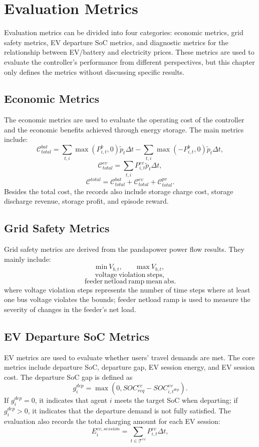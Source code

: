 \section{Evaluation Metrics}

Evaluation metrics can be divided into four categories: economic metrics, grid safety metrics, EV departure SoC metrics, and diagnostic metrics for the relationship between EV/battery and electricity prices. These metrics are used to evaluate the controller's performance from different perspectives, but this chapter only defines the metrics without discussing specific results.

\subsection{Economic Metrics}

The economic metrics are used to evaluate the operating cost of the controller and the economic benefits achieved through energy storage. The main metrics include:
\[
  \mathcal{C}^{bat}_{total}
  =
  \sum_{t,i}
  \max(P^b_{i,t},0)\tilde p_t\Delta t
  -
  \sum_{t,i}
  \max(-P^b_{i,t},0)\tilde p_t\Delta t,
\]
\[
  \mathcal{C}^{ev}_{total}
  =
  \sum_{t,i}
  P^{ev}_{i,t}\tilde p_t\Delta t,
\]
\[
  \mathcal{C}^{total}=\mathcal{C}^{bat}_{total}+\mathcal{C}^{ev}_{total}+\mathcal{C}^{pv}_{total}.
\]
Besides the total cost, the records also include storage charge cost, storage discharge revenue, storage profit, and episode reward.

\subsection{Grid Safety Metrics}

Grid safety metrics are derived from the pandapower power flow results. They mainly include:
\[
  \mathrm{min}\ V_{b,t},\qquad
  \mathrm{max}\ V_{b,t},
\]
\[
  \mathrm{voltage\ violation\ steps},
\]
\[
  \mathrm{feeder\ netload\ ramp\ mean\ abs}.
\]
where voltage violation steps represents the number of time steps where at least one bus voltage violates the bounds; feeder netload ramp is used to measure the severity of changes in the feeder's net load.

\subsection{EV Departure SoC Metrics}

EV metrics are used to evaluate whether users' travel demands are met. The core metrics include departure SoC, departure gap, EV session energy, and EV session cost. The departure SoC gap is defined as
\[
  g^{dep}_{i}
  =
  \max(0,SOC^{ev}_{req}-SOC^{ev}_{i,t^{dep}}).
\]
If \(g^{dep}_{i}=0\), it indicates that agent \(i\) meets the target SoC when departing; if \(g^{dep}_{i}>0\), it indicates that the departure demand is not fully satisfied. The evaluation also records the total charging amount for each EV session:
\[
  E^{ev,session}_{i}
  =
  \sum_{t\in\mathcal{T}^{ev}}P^{ev}_{i,t}\Delta t,
\]


